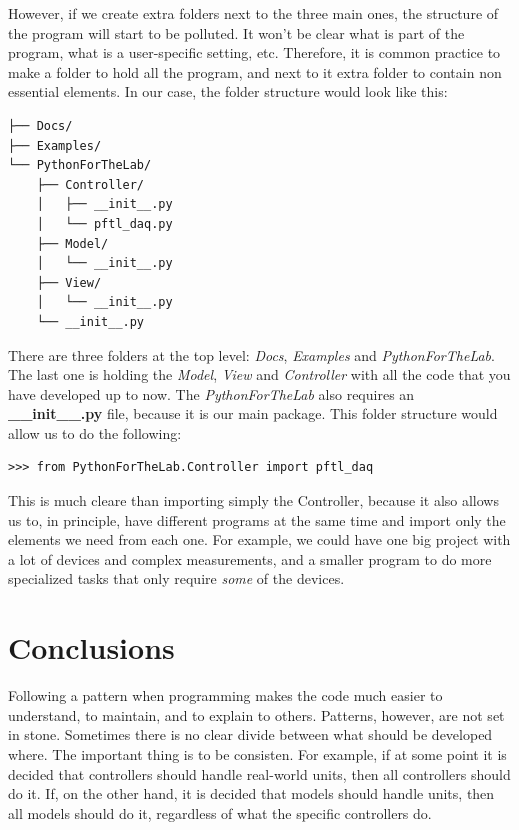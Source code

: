 However, if we create extra folders next to the three main ones, the structure of the program will start to be polluted. It won't be clear what is part of the program, what is a user-specific setting, etc. Therefore, it is common practice to make a folder to hold all the program, and next to it extra folder to contain non essential elements. In our case, the folder structure would look like this:

\begin{verbatim}
├── Docs/
├── Examples/
└── PythonForTheLab/
    ├── Controller/
    │   ├── __init__.py
    │   └── pftl_daq.py
    ├── Model/
    │   └── __init__.py
    ├── View/
    │   └── __init__.py
    └── __init__.py
\end{verbatim}

There are three folders at the top level: \emph{Docs}, \emph{Examples} and \emph{PythonForTheLab}. The last one is holding the \emph{Model}, \emph{View} and \emph{Controller} with all the code that you have developed up to now. The \emph{PythonForTheLab} also requires an \textbf{\_\_init\_\_.py} file, because it is our main package. This folder structure would allow us to do the following:

\begin{verbatim}
>>> from PythonForTheLab.Controller import pftl_daq
\end{verbatim}

This is much cleare than importing simply the Controller, because it also allows us to, in principle, have different programs at the same time and import only the elements we need from each one. For example, we could have one big project with a lot of devices and complex measurements, and a smaller program to do more specialized tasks that only require \emph{some} of the devices.

\section{Conclusions}\label{section:layout-conclusions}
Following a pattern when programming makes the code much easier to understand, to maintain, and to explain to others. Patterns, however, are not set in stone. Sometimes there is no clear divide between what should be developed where. The important thing is to be consisten. For example, if at some point it is decided that controllers should handle real-world units, then all controllers should do it. If, on the other hand, it is decided that models should handle units, then all models should do it, regardless of what the specific controllers do.

